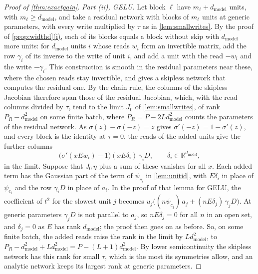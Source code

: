 \documentclass[10pt]{article}
\theoremstyle{definition}
\theoremstyle{remark}
\newcommand{\R}{\mathbb{R}}
\newcommand{\dm}{d_{\mathrm{model}}}
\DeclareRobustCommand{\cpref}[2]{\hyperref[#1:#2]{\cref*{#1}(#2)}}
\begin{document}
\begin{proof}[Proof of \cref{thm:exactgain}]
\emph{Part (ii), GELU.} Let block $\ell$ have $m_\ell + \dm$ units, with $m_\ell \ge \dm$, and take a residual network with blocks of $m_\ell$ units at generic parameters, with every write multiplied by $\tau$ as in \cref{lem:smallwrites}. By the proof of \cpref{prop:widthd}{i}, each of its blocks equals a block without skip with $\dm$ more units: for $\dm$ units $i$ whose reads $w_i$ form an invertible matrix, add the row $\gamma_i$ of its inverse to the write of unit $i$, and add a unit with the read $-w_i$ and the write $-\gamma_i$. This construction is smooth in the residual parameters near these, where the chosen reads stay invertible, and gives a skipless network that computes the residual one. By the chain rule, the columns of the skipless Jacobian therefore span those of the residual Jacobian, which, with the read columns divided by $\tau$, tend to the limit $J_0$ of \cref{lem:smallwrites}, of rank $P_R - \dm^2$ on some finite batch, where $P_R = P - 2L\dm^2$ counts the parameters of the residual network. As $\sigma(z) - \sigma(-z) = z$ gives $\sigma'(-z) = 1 - \sigma'(z)$, and every block is the identity at $\tau = 0$, the reads of the added units give the further columns
\[
\big(\sigma'(xEw_i) - 1\big)(xE\delta_i)\,\gamma_iD,\qquad \delta_i \in \R^{\dm},
\]
in the limit. Suppose that $J_0\,\eta$ plus a sum of these vanishes for all $x$. Each added term has the Gaussian part of the term of $\psi_{c_i}$ in \cref{lem:unitid}, with $E\delta_i$ in place of $\psi_{c_i}$ and the row $\gamma_iD$ in place of $a_i$. In the proof of that lemma for GELU, the coefficient of $t^2$ for the slowest unit $j$ becomes $u_j\big((n\psi_{c_j})\,a_j + (nE\delta_j)\,\gamma_jD\big)$. At generic parameters $\gamma_jD$ is not parallel to $a_j$, so $nE\delta_j = 0$ for all $n$ in an open set, and $\delta_j = 0$ as $E$ has rank $\dm$; the proof then goes on as before. So, on some finite batch, the added reads raise the rank in the limit by $L\dm^2$, to $P_R - \dm^2 + L\dm^2 = P - (L+1)\dm^2$. By lower semicontinuity the skipless network has this rank for small $\tau$, which is the most its symmetries allow, and an analytic network keeps its largest rank at generic parameters.
\end{proof}
\end{document}
